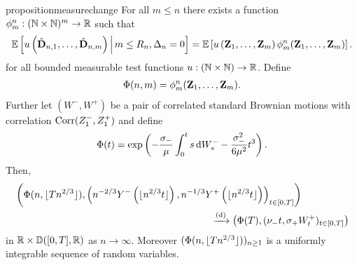 \begin{restatable}{proposition}{measurechange}
    \label{prop:measure-change}
    For all $m \leq n$ there exists a function $\phi^n_m: ({\mathbb N} \times {\mathbb N})^m \to {\mathbb R}$ such that 
    \begin{equation*}
        {\mathbb E}\left[ 
            u\left( 
                \hat{{\mathbf D}}_{n, 1}, \ldots, \hat{{\mathbf D}}_{n, m}
             \right) 
             \,\middle\vert\,
             m \leq R_n, \Delta_n = 0
         \right]
        =
        {\mathbb E}\left[ 
            u\left( 
                {\mathbf Z}_1, \ldots, {\mathbf Z}_m
             \right)
             \phi^n_m({\mathbf Z}_1, \ldots, {\mathbf Z}_m)
         \right].
    \end{equation*}
    for all bounded measurable test functions $u: ({\mathbb N} \times {\mathbb N}) \to {\mathbb R}$. Define
    \begin{align*}
        \Phi(n, m) = \phi^n_m({\mathbf Z}_1, \ldots, {\mathbf Z}_m).
    \end{align*}
    Further let $(W^-, W^+)$ be a pair of correlated standard Brownian motions with correlation $\operatorname{Corr}(Z^-_1, Z^+_1)$ and define
    \begin{equation*}
        \Phi(t) = \exp \left( 
            - \frac{\sigma_-}{\mu} \int_0^t s \mathop{}\!\mathrm{d} W^-_s - \frac{\sigma_-^2}{6 \mu^2} t^3
         \right).
    \end{equation*}
    Then,
    \begin{align*}
        &\left( 
            \Phi(n, \floor{T n^{2/3}}),
            \left(
                n^{-2/3} Y^-\left( \floor{n^{2/3} t} \right),
                n^{-1/3} Y^+\left( \floor{n^{2/3} t} \right)
            \right)_{t \in [0, T]}
        \right) \\
        & \hspace{20em} \todist \left( 
            \Phi(T),
            (\nu_- t, \sigma_+ W^+_t)_{t \in [0, T]}
        \right)
    \end{align*}
    in ${\mathbb R} \times {\mathbb D}([0, T], {\mathbb R})$ as $n \to \infty$. Moreover $(\Phi(n, \lfloor T n^{2/3}\rfloor))_{n \geq 1}$ is a uniformly integrable sequence of random variables.
\end{restatable}